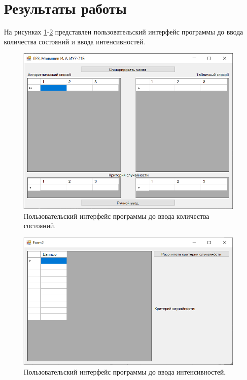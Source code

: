 \documentclass[12pt]{report}
\begin{document}
\section{Результаты работы}

На рисунках \ref{img:ui1}-\ref{img:ui2} представлен пользовательский интерфейс программы до ввода количества состояний и ввода интенсивностей.

\begin{figure}[H]
	\begin{center}
		\includegraphics[scale=0.6]{imgs/ui1.png}
	\end{center}
	\caption{Пользовательский интерфейс программы до ввода количества состояний.}
	\label{img:ui1}
\end{figure}

\begin{figure}[H]
	\begin{center}
		\includegraphics[scale=0.6]{imgs/ui2.png}
	\end{center}
	\caption{Пользовательский интерфейс программы до ввода интенсивностей.}
	\label{img:ui2}
\end{figure}
\end{document}
